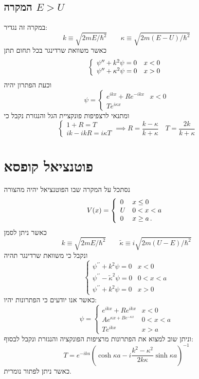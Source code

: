 \documentclass{tstextbook}
\begin{document}
\subsection{המקרה \(E>U\)}

במקרה זה נגדיר:
$$k\equiv\sqrt{2m E/\hbar^{2}}\qquad \kappa\equiv{\sqrt{2m(E-U)/\hbar^{2}}}$$
כאשר משוואת שרדינגר בכל תחום תתן
$$\left\{\begin{array}{l l}{{\psi^{\prime\prime}+k^{2}\psi=0}}&{{x<0}}\\ {{\psi^{\prime\prime}+\kappa^{2}\psi=0}}&{{x>0}}\end{array}\right.$$
וכעת הפתרון יהיה
$$\psi=\begin{cases}e^{ ikx }+R e^{ -ikx } & x<0 \\Te^{ i\kappa x }
\end{cases}$$
ומתנאי לרצפיפות פונקציית הגל והנגזרת נקבל כי
$$\begin{cases}1+R=T \\ik-ikR=i\kappa T
\end{cases}\implies R=\frac{k-\kappa}{k+\kappa}\quad T=\frac{2k}{k+\kappa}$$

\section{פוטנציאל קופסא}

נסתכל על המקרה שבו הפוטנציאל יהיה מהצורה
$$V(x)=\left\{\begin{array}{l l}{{0}}&{{x\leq0}}\\ {{U}}&{{0<x<a}}\\ {{0}}&{{x\geq a\,.}}\end{array}\right.$$
כאשר ניתן לסמן
$$k\equiv{\sqrt{2m E/\hbar^{2}}} \qquad \tilde{\kappa}\equiv i\sqrt{2m(U-E)/\hbar^{2}}$$
ונקבל כי משוואת שרדינגר תהיה
$$\begin{cases}\psi^{\prime\prime}+k^{2}\psi=0 & x< 0\\\psi^{\prime\prime}-\tilde{\kappa}^{2}\psi=0 & 0<x<a \\\psi^{\prime\prime}+k^{2}\psi=0 & x> 0
\end{cases}$$
כאשר אנו יודעים כי הפתרונות יהיו:
$$\psi=\begin{cases}e^{ ikx }+ R e^{ ikx } & x<0 \\Ae^{ \kappa x + B e^{ -\kappa x } } & 0<x<a \\Te^{ ikx } & x>a
\end{cases}$$
וניתן שוב למצוא את הפתרונות מרציפות הפונקציה והנגזרת ונקבל לבסוף:
$$T=e^{-i k a}\left(\cosh\kappa a-i\frac{k^{2}-\kappa^{2}}{2k\kappa}\sinh\kappa a\right)^{-1}$$
כאשר ניתן לפתור נומרית.
\end{document}

